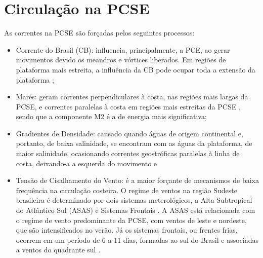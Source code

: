 \section{Circulação na PCSE}
\label{sec:circulation}

\hspace{5mm} As correntes na PCSE são forçadas pelos seguintes processos:

\begin{itemize}
    \item Corrente do Brasil (CB): influencia, principalmente, a PCE, ao gerar movimentos devido os meandros e vórtices liberados. Em regiões de plataforma mais estreita, a influência da CB pode ocupar toda a extensão da plataforma \citep{castro2008processos};

    \item Marés: geram correntes perpendiculares à costa, nas regiões mais largas da PCSE, e correntes paralelas à costa em regiões mais estreitas da PCSE \citep{pereira2007numerical}, sendo que a componente M2 é a de energia mais significativa;

    \item Gradientes de Densidade: causado quando águas de origem continental e, portanto, de baixa salinidade, se encontram com as águas da plataforma, de maior salinidade, ocasionando correntes geostróficas paralelas à linha de costa, deixando-a a esquerda do movimento \citep{brink2005coastal} e

    \item Tensão de Cisalhamento do Vento: é a maior forçante de mecanismos de baixa frequência na circulação costeira. O regime de ventos na região Sudeste brasileira é determinado por dois sistemas meterológicos, a Alta Subtropical do Atlântico Sul (ASAS) e Sistemas Frontais \citep{castro1998physical}. A ASAS está relacionada com o regime de vento predominante da PCSE, com ventos de leste e nordeste, que são intensificados no verão. Já os sistemas frontais, ou frentes frias, ocorrem em um período de 6 a 11 dias, formadas ao sul do Brasil e associadas a ventos do quadrante sul \citep{stech1990estudo,stech1992response}.
\end{itemize}


